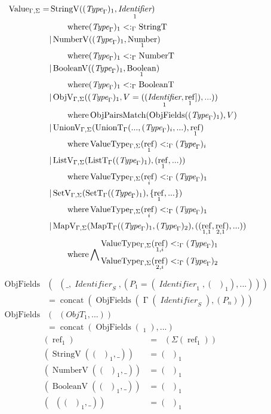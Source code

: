 \documentclass[12pt]{article}
\DeclareMathOperator{\StringT}{StringT}
\DeclareMathOperator{\NumberT}{NumberT}
\DeclareMathOperator{\BooleanT}{BooleanT}
\DeclareMathOperator{\ObjT}{ObjT_\Gamma}
\DeclareMathOperator{\ListT}{ListT_\Gamma}
\DeclareMathOperator{\SetT}{SetT_\Gamma}
\DeclareMathOperator{\MapT}{MapT_\Gamma}
\DeclareMathOperator{\UnionT}{UnionT_\Gamma}
\DeclareMathOperator{\InterT}{InterT_\Gamma}
\DeclareMathOperator{\LookupObjRef}{\Gamma}
\DeclareMathOperator{\Identifier}{\textit{Identifier}}
\DeclareMathOperator{\Number}{Number}
\DeclareMathOperator{\Boolean}{Boolean}
\DeclareMathOperator{\Type}{{\textit{Type}_\Gamma}}
\DeclareMathOperator{\Value}{Value_{\Gamma, \Sigma}}
\DeclareMathOperator{\IdentifierV}{StringV}
\DeclareMathOperator{\NumberV}{NumberV}
\DeclareMathOperator{\BooleanV}{BooleanV}
\DeclareMathOperator{\ObjV}{ObjV_{\Gamma, \Sigma}}
\DeclareMathOperator{\ListV}{ListV_{\Gamma, \Sigma}}
\DeclareMathOperator{\SetV}{SetV_{\Gamma, \Sigma}}
\DeclareMathOperator{\MapV}{MapV_{\Gamma, \Sigma}}
\DeclareMathOperator{\UnionV}{UnionV_{\Gamma, \Sigma}}
\DeclareMathOperator{\ValueType}{ValueType_{\Gamma, \Sigma}}
\DeclareMathOperator{\textref}{ref}
\DeclareMathOperator{\ObjFields}{ObjFields}
\DeclareMathOperator{\ObjPairsMatch}{ObjPairsMatch}
\newcommand{\ValueRef}{\textref}
\newcommand{\ValueDeref}[1]{\Sigma(#1)}
\newcommand{\subtype}{<:_\Gamma}
\begin{document}
\begin{figure}
\begin{mdframed}
\begin{align*}
    \Value =& \IdentifierV((\Type)_1, \Identifier_1) \newlinewhere (\Type)_1 \subtype \StringT \\
    &| \NumberV((\Type)_1, \Number_1) \newlinewhere (\Type)_1 \subtype \NumberT \\
    &| \BooleanV((\Type)_1, \Boolean_1) \newlinewhere (\Type)_1 \subtype \BooleanT \\
    &| \ObjV((\Type)_1, V=((\Identifier_1, \ValueRef_1]), ...)) \newlinewhere
    \ObjPairsMatch(\ObjFields((\Type)_1), V) \\
    &| \UnionV(\UnionT(..., (\Type)_i, ...), \ValueRef_1) \newlinewhere
    \ValueType(\ValueRef_1) \subtype (\Type)_i\\
    &| \ListV(\ListT((\Type)_1), (\ValueRef_1, ...)) \newlinewhere \ValueType(\ValueRef_i) \subtype (\Type)_1 \\
    &| \SetV(\SetT((\Type)_1), \{\ValueRef_1, ...\}) \newlinewhere \ValueType(\ValueRef_i) \subtype (\Type)_1 \\
    &| \MapV(\MapT((\Type)_1, (\Type)_2), ((\ValueRef_{1,1}, \ValueRef_{2,1}), ...)) \newlinewhere \bigwedge
    \begin{aligned}
        \ValueType(\ValueRef_{1, i}) \subtype (\Type)_1 \\
        \ValueType(\ValueRef_{2, i}) \subtype (\Type)_2 
    \end{aligned}
\end{align*}
\begin{align*}
    \ObjFields&(\ObjT(\_, \Identifier_S, (P_1 = (\Identifier_1, (\Type)_1), ...))) \\&= \operatorname{concat}(\ObjFields(\LookupObjRef(\Identifier_S), (P_n))) \\
    \ObjFields&(\InterT(ObjT_1, ...)) \\&= \operatorname{concat}(\ObjFields(\ObjT_1), ...)
\end{align*}
\begin{align*}
    \ValueType(\ValueRef_1) &= \ValueType(\ValueDeref{\ValueRef_1}) \\
    \ValueType(\IdentifierV((\Type)_1, \_)) &= (\Type)_1 \\
    \ValueType(\NumberV((\Type)_1, \_)) &= (\Type)_1 \\
    \ValueType(\BooleanV((\Type)_1, \_)) &= (\Type)_1 \\
    \ValueType(\ObjV((\Type)_1, \_)) &= (\Type)_1 \\

\end{align*}
\end{mdframed}
\end{figure}
\end{document}
